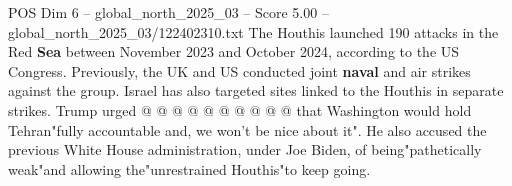 \begin{textsample}{POS Dim 6 – global\_north\_2025\_03 – Score 5.00 – global\_north\_2025\_03/122402310.txt}
The Houthis launched 190 attacks in the Red \textbf{Sea} between November 2023 and October 2024, according to the US Congress.
Previously, the UK and US conducted joint \textbf{naval} and air strikes against the group.
Israel has also targeted sites linked to the Houthis in separate strikes.
Trump urged @ @ @ @ @ @ @ @ @ @ that Washington would hold Tehran"fully accountable and, we won't be nice about it".
He also accused the previous White House administration, under Joe Biden, of being"pathetically weak"and allowing the"unrestrained Houthis"to keep going.

\end{textsample}
